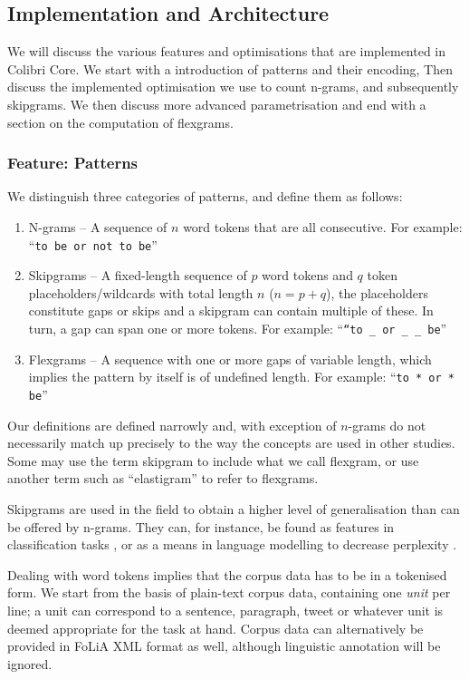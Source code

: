 \documentclass[a4paper,12pt]{article}
\begin{document}
\subsection{Implementation and Architecture}

We will discuss the various features and optimisations that are implemented in Colibri Core. We start with a introduction of patterns and their encoding,
Then discuss the implemented optimisation we use to count n-grams, and subsequently skipgrams. We then discuss more advanced parametrisation and end with a section on the computation of flexgrams.

\subsubsection{Feature: Patterns}
\label{sec:patterns}

We distinguish three categories of patterns, and define them as follows:

\begin{enumerate}
    \item N-grams -- A sequence of $n$ word tokens that are all consecutive.
        For example: ``\texttt{to be or not to be}''
    \item Skipgrams -- A fixed-length sequence of $p$ word tokens and $q$ token
        placeholders/wildcards with total length $n$ ($n=p+q$), the
        placeholders constitute gaps or skips and a skipgram can contain
        multiple of these. In turn, a gap can span one or more tokens. For
    example: ``\texttt{``to \_ or \_ \_ be}''
    \item Flexgrams -- A sequence with one or more gaps of variable length,
        which implies the pattern by itself is of undefined length. For example:
        ``\texttt{to * or * be}''
\end{enumerate}

Our definitions are defined narrowly and, with exception of $n$-grams do not
necessarily match up precisely to the way the concepts are used in other studies. Some
may use the term skipgram to include what we call flexgram, or use another term
such as ``elastigram'' to refer to flexgrams. 

Skipgrams are used in the field to obtain a higher level of generalisation than
can be offered by n-grams. They can, for instance, be found as features in
classification tasks \cite{DHONDT}, or as a means in language modelling to
decrease perplexity \cite{Guthrie06}.

Dealing with word tokens implies that the corpus data has to be in a
tokenised form. We start from the basis of plain-text corpus data, containing one
\emph{unit} per line; a unit can correspond to a sentence, paragraph, tweet
or whatever unit is deemed appropriate for the task at hand. Corpus data can
alternatively be provided in FoLiA XML format \cite{FOLIAPAPER} as well, although linguistic
annotation will be ignored.
\end{document}
